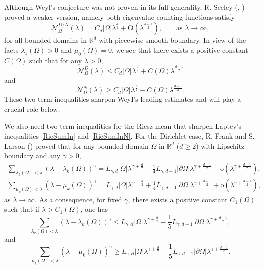 \documentclass[11pt,letterpaper]{amsart}
\numberwithin{equation}{section}
\theoremstyle{plain}
\theoremstyle{plain}
\numberwithin{equation}{section}
\theoremstyle{remark}
\begin{document}
	Although Weyl's conjecture was not proven in its full generality, R. Seeley  (\cite{S78}, \cite{S}) proved a weaker version, namely both eigenvalue counting functions satisfy  
	\begin{equation}\label{SeeleyDN}
		\mathcal N^{D/N}_\Omega(\lambda)= C_d|\Omega|\lambda^{\frac{d}{2}}+ \mathrm O(\lambda^{\frac{d-1}{2}}), \qquad \text{as\ } \lambda \to \infty,
	\end{equation}
	for all  bounded domains in $\mathbb{R}^d$ with piecewise smooth boundary. %
	In view of the facts $\lambda_1(\Omega)>0$ and $\mu_0(\Omega)=0$, we see that there exists a positive constant $C(\Omega)$ such that for any $\lambda>0$,  
	\begin{equation}\label{2termweyl}
		\mathcal N^D_\Omega(\lambda)\le C_d|\Omega|\lambda^{\frac{d}{2}}+ C(\Omega) \lambda^{\frac{d-1}{2}}
	\end{equation}
	and 		
	\begin{equation}\label{2termweylN}
		\mathcal N^N_\Omega(\lambda)\ge C_d|\Omega|\lambda^{\frac{d}{2}}- C(\Omega) \lambda^{\frac{d-1}{2}}.
	\end{equation}
	These two-term inequalities sharpen Weyl's leading estimates and will play a crucial role below. 
	
	We also need two-term inequalities for the Riesz mean that sharpen Laptev's inequalities \eqref{RieSumIn} and \eqref{RieSumInN}.
	For the Dirichlet case, 
	R. Frank and S. Larson (\cite[Theorem 1.1]{FL24Lip}) proved that for any bounded domain $\Omega$ in $\mathbb R^d$ ($d\ge 2$) with Lipschitz boundary and any $\gamma> 0$, 
	\[
	\begin{aligned}
	\sum_{\lambda_k(\Omega)< \lambda} (\lambda-\lambda_k(\Omega))^\gamma= L_{\gamma,d}|\Omega| \lambda^{\gamma+\frac{d}{2}}-\frac{1}{4} L_{\gamma,d-1} |\partial \Omega| \lambda^{\gamma+\frac{d-1}{2}}+ \mathrm o(\lambda^{\gamma+\frac{d-1}{2}}),\\
	\sum_{\mu_k(\Omega)< \lambda} (\lambda-\mu_k(\Omega))^\gamma= L_{\gamma,d}|\Omega| \lambda^{\gamma+\frac{d}{2}}+ \frac{1}{4} L_{\gamma,d-1} |\partial \Omega| \lambda^{\gamma+\frac{d-1}{2}}+ \mathrm o(\lambda^{\gamma+\frac{d-1}{2}}),
	\end{aligned}
	\]
	as $\lambda \to \infty$.  As a consequence, for fixed $\gamma$, there exists a positive constant $C_1(\Omega)$ such that if $\lambda > C_1(\Omega)$, one has
	\begin{equation}\label{RieszDiri}
		\sum_{\lambda_k(\Omega)< \lambda} (\lambda-\lambda_k(\Omega))^\gamma\le L_{\gamma,d}|\Omega| \lambda^{\gamma+\frac{d}{2}}-\frac{1}{5} L_{\gamma,d-1} |\partial \Omega| \lambda^{\gamma+\frac{d-1}{2}},
	\end{equation}
	and
	\begin{equation} \label{RiezsNeu}
		\sum_{\mu_k(\Omega)< \lambda} (\lambda-\mu_k(\Omega))^\gamma\ge L_{\gamma,d}|\Omega| \lambda^{\gamma+\frac{d}{2}}+ \frac{1}{5} L_{\gamma,d-1} |\partial \Omega| \lambda^{\gamma+\frac{d-1}{2}}.
	\end{equation}
	
\end{document}
